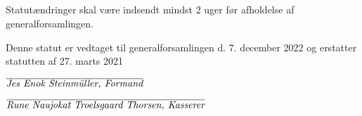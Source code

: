 \documentclass[danish,a4paper,twocolumn]{article}
\begin{document}
\subsection{}Statutændringer skal være indsendt mindst 2 uger før afholdelse af generalforsamlingen.

\vspace{2cm}
Denne statut er vedtaget til generalforsamlingen d. 7. december 2022 og erstatter statutten af 27. marts 2021

\vspace{0.5cm}
$\overline{\emph{Jes Enok Steinmüller, Formand}}$

\vspace{0.1cm}
$\overline{\emph{Rune Naujokat Troelsgaard Thorsen, Kasserer}}$
\end{document}
